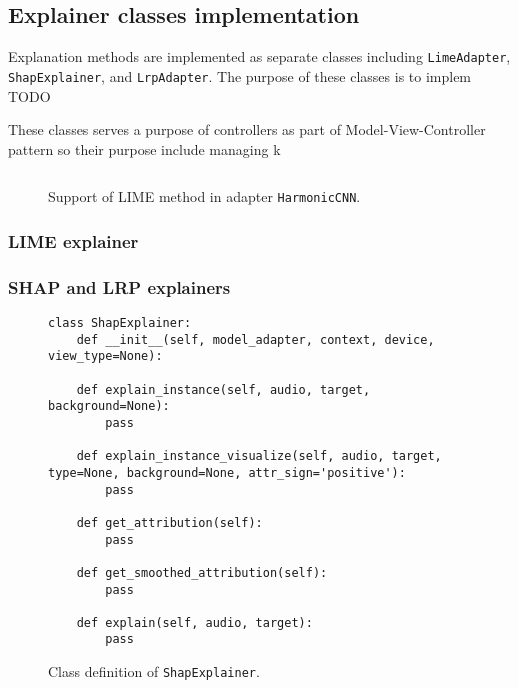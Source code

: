 \documentclass[
    bindingoffset=5mm,  %
    footnoteindent=3mm, %
    hyphenation=true    %
]{src/wut-thesis}
\begin{document}

\subsection{Explainer classes implementation}

Explanation methods are implemented as separate classes including \texttt{LimeAdapter}, \texttt{ShapExplainer}, and \texttt{LrpAdapter}.
The purpose of these classes is to implem TODO

These classes serves a purpose of controllers as part of Model-View-Controller
pattern so their purpose include managing k


\begin{figure}%
\begin{verbatim}

\end{verbatim}
\caption{Support of LIME method in adapter \texttt{HarmonicCNN}.}
\label{fig:HarmonicLLIMEOverload}
\end{figure}


\subsubsection{LIME explainer}
\subsubsection{SHAP and LRP explainers}
\begin{figure}%
\begin{verbatim}
class ShapExplainer:
    def __init__(self, model_adapter, context, device, view_type=None):

    def explain_instance(self, audio, target, background=None):
        pass
    
    def explain_instance_visualize(self, audio, target, type=None, background=None, attr_sign='positive'):  
        pass

    def get_attribution(self):
        pass

    def get_smoothed_attribution(self):
        pass
    
    def explain(self, audio, target):
        pass
\end{verbatim}
\caption{Class definition of \texttt{ShapExplainer}.}
\label{fig:ShapExplainer}
\end{figure}
\end{document}
